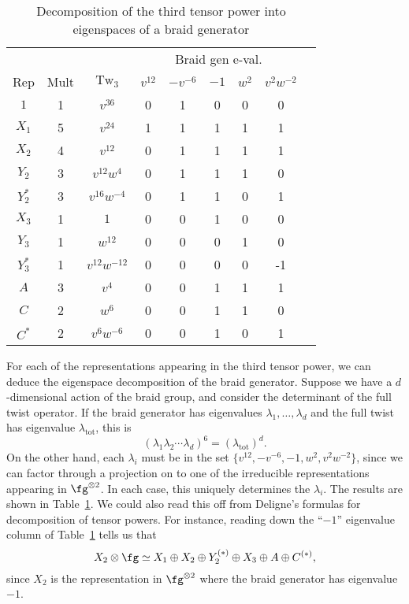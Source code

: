 \documentclass[12pt]{amsart}
\DeclareMathOperator{\Tw}{Tw}
\begin{document}
\begin{table}
  \centering
  \begin{tabular}{ccccccccc}
    \toprule
    &&&\multicolumn{5}{c}{Braid gen e-val.} \\ \cmidrule(l){4-8}
    Rep & Mult & $\Tw_3$ & $v^{12}$ & $-v^{-6}$ & $-1$ & $w^2$ & $v^2w^{-2}$ \\
    \midrule
    $1$ & 1 & $v^{36}$ & 0 & 1 & 0 & 0 & 0 \\[2pt]
    $X_1$ & 5 & $v^{24}$ & 1 & 1 & 1 & 1 & 1 \\[2pt]
    $X_2$ & 4 & $v^{12}$ & 0 & 1 & 1 & 1 & 1 \\[2pt]
    $Y_2$ & 3 & $v^{12}w^4$ & 0 & 1 & 1 & 1 & 0 \\[2pt]
    $Y_2^*$ & 3 & $v^{16}w^{-4}$ & 0 & 1 & 1 & 0 & 1 \\[2pt]
    $X_3$ & 1 & $1$ & 0 & 0 & 1 & 0 & 0 \\[2pt]
    $Y_3$ & 1 & $w^{12}$ & 0 & 0 & 0 & 1 & 0 \\[2pt]
    $Y_3^*$ & 1 & $v^{12}w^{-12}$ & 0 & 0 & 0 & 0 & -1 \\[2pt]
    $A$ & 3 & $v^4$ & 0 & 0 & 1 & 1 & 1\\[2pt]
    $C$ & 2 & $w^6$ & 0 & 0 & 1 & 1 & 0\\[2pt]
    $C^*$ & 2 & $v^6w^{-6}$ & 0 & 0 & 1 & 0 & 1\\
    \bottomrule
  \end{tabular}
  \medskip
  \caption{Decomposition of the third tensor power into eigenspaces of a braid generator}\label{tab:braid-gen}
\end{table}

For each of the representations appearing in the third tensor power,
we can deduce the eigenspace decomposition of the braid
generator. Suppose we have a $d$-dimensional action of the braid
group, and consider the determinant of the full twist operator. If the
braid generator has eigenvalues $\lambda_1,\dots,\lambda_d$ and the
full twist has eigenvalue $\lambda_{\text{tot}}$, this is
\[
(\lambda_1\lambda_2\cdots\lambda_d)^6 = (\lambda_{\text{tot}})^d.
\]
On the other hand, each $\lambda_i$ must be in the set
$\{v^{12},-v^{-6},-1,w^2,v^2w^{-2}\}$, since we can factor through a
projection on to one of the irreducible representations appearing in
$\fg^{\otimes2}$. In each case, this uniquely determines the
$\lambda_i$. The results are shown in Table~\ref{tab:braid-gen}. We
could also read this off from Deligne's formulas for decomposition of
tensor powers. For instance, reading down the ``$-1$'' eigenvalue
column of Table~\ref{tab:braid-gen} tells us that
\[
X_2 \otimes \fg \simeq X_1 \oplus X_2 \oplus Y_2^{(*)} \oplus X_3
\oplus A \oplus C^{(*)},
\]
since $X_2$ is the representation in $\fg^{\otimes2}$ where the braid
generator has eigenvalue $-1$.
\end{document}
